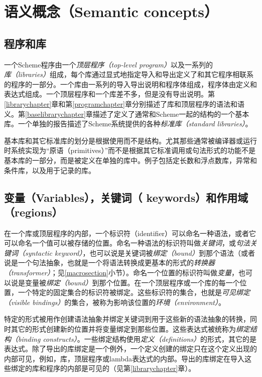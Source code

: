 \chapter{语义概念（Semantic concepts）}
\label{basicchapter}

\section{程序和库}

一个Scheme程序由一个\textit{顶层程序（top-level program）}以及一系列的\textit{库（libraries）}组成，每个库通过显式地指定导入和导出定义了和其它程序相联系的程序的一部分。一个库由一系列的导入导出说明和程序体组成，程序体由定义和表达式组成。一个顶层程序和一个库差不多，但是没有导出说明。第\ref{librarychapter}章和第\ref{programchapter}章分别描述了库和顶层程序的语法和语义。第\ref{baselibrarychapter}章描述了定义了通常和Scheme一起的结构的一个基本库。一个单独的报告\cite{R6RS-libraries}描述了Scheme系统提供的各种\textit{标准库（standard libraries）}。

基本库和其它标准库的划分是根据使用而不是结构。尤其那些通常被编译器或运行时系统实现为“原语（primitives）”而不是根据其它标准调用或句法形式的功能不是基本库的一部分，而是被定义在单独的库中。例子包括定长数和浮点数库，异常和条件库，以及用于记录的库。

\section{变量（Variables），关键词（ keywords）和作用域（regions）}
\label{specialformsection}
\label{variablesection}

在一个库或顶层程序的内部，一个标识符（identifier）可以命名一种语法，或者它可以命名一个值可以被存储的位置。命名一种语法的标识符叫做{\em 关键词}，或{\em 句法关键词（syntactic keyword）}，也可以说是关键词被{\em 绑定（bound）}到那个语法（或者说是一个句法抽象，也就是一个将语法转换成更基本的形式的{\em 转换器（transformer）}；见\ref{macrosection}小节）。命名一个位置的标识符叫做{\em 变量}，也可以说是变量被{\em 绑定（bound）}到那个位置。在一个顶层程序或一个库的每一个位置，一个特定的固定集合的标识符被绑定。这些标识符的集合，也就是\textit{可见绑定（visible bindings）}的集合，被称为影响该位置的{\em 环境（environment）}。

特定的形式被用作创建语法抽象并绑定关键词到用于这些新的语法抽象的转换，同时其它的形式创建新的位置并将变量绑定到那些位置。这些表达式被统称为{\em 绑定结构（binding constructs）}。一些绑定结构使用\textit{定义（definitions）}的形式，其它的是表达式。除了导出的库绑定是一个例外，一个定义创建的绑定只在这个定义出现的内部可见，例如，库，顶层程序或{\cf lambda}表达式的内部。导出的库绑定在导入这些绑定的库和程序的内部是可见的（见第\ref{librarychapter}章）。

